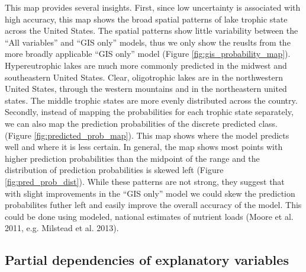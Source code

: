 \documentclass[11pt,]{article}
\begin{document}
This map provides several insights. First, since low uncertainty is
associated with high accuracy, this map shows the broad spatial patterns
of lake trophic state across the United States. The spatial patterns
show little variability between the ``All variables'' and ``GIS only''
models, thus we only show the reuslts from the more broadly applicable
``GIS only'' model (Figure \ref{fig:gis_probability_map}).
Hypereutrophic lakes are much more commonly predicted in the midwest and
southeastern United States. Clear, oligotrophic lakes are in the
northwestern United States, through the western mountains and in the
northeastern united states. The middle trophic states are more evenly
distributed across the country. Secondly, instead of mapping the
probabilities for each trophic state separately, we can also map the
prediction probabilities of the discrete predicted class. (Figure
\ref{fig:predicted_prob_map}). This map shows where the model predicts
well and where it is less certain. In general, the map shows most points
with higher prediction probabilities than the midpoint of the range and
the distribution of prediction probabilities is skewed left (Figure
\ref{fig:pred_prob_dist}). While these patterns are not strong, they
suggest that with slight improvements in the ``GIS only'' model we could
skew the prediction probabilites futher left and easily improve the
overall accuracy of the model. This could be done using modeled,
national estimates of nutrient loads (Moore et al. 2011, e.g. Milstead
et al. 2013).

\subsection{Partial dependencies of explanatory
variables}\label{partial-dependencies-of-explanatory-variables}
\end{document}
